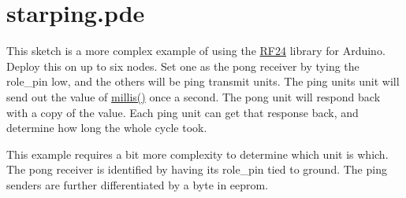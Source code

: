 \hypertarget{starping_8pde-example}{}\section{starping.\+pde}
This sketch is a more complex example of using the \hyperlink{classRF24}{R\+F24} library for Arduino. Deploy this on up to six nodes. Set one as the \textquotesingle{}pong receiver\textquotesingle{} by tying the role\+\_\+pin low, and the others will be \textquotesingle{}ping transmit\textquotesingle{} units. The ping units unit will send out the value of \hyperlink{group__Porting__General_gad5b3ec1ce839fa1c4337a7d0312e9749}{millis()} once a second. The pong unit will respond back with a copy of the value. Each ping unit can get that response back, and determine how long the whole cycle took.

This example requires a bit more complexity to determine which unit is which. The pong receiver is identified by having its role\+\_\+pin tied to ground. The ping senders are further differentiated by a byte in eeprom.


